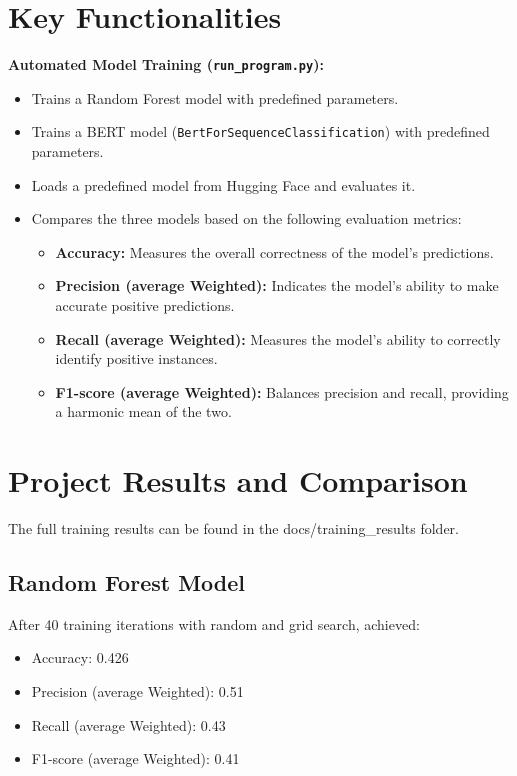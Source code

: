 \documentclass{article}
\begin{document}
\section*{Key Functionalities}
\textbf{Automated Model Training (\texttt{run\_program.py}):}
\begin{itemize}[label=--]
  \item Trains a Random Forest model with predefined parameters.
  \item Trains a BERT model (\texttt{BertForSequenceClassification}) with predefined parameters.
  \item Loads a predefined model from Hugging Face and evaluates it.
  \item Compares the three models based on the following evaluation metrics:
    \begin{itemize}
      \item \textbf{Accuracy:} Measures the overall correctness of the model's predictions.
      \item \textbf{Precision (average Weighted):} Indicates the model's ability to make accurate positive predictions.
      \item \textbf{Recall (average Weighted):} Measures the model's ability to correctly identify positive instances.
      \item \textbf{F1-score (average Weighted):} Balances precision and recall, providing a harmonic mean of the two.
    \end{itemize}
\end{itemize}

\section*{Project Results and Comparison}
The full training results can be found in the docs/training\_results folder.
\subsection*{Random Forest Model}
After 40 training iterations with random and grid search, achieved:
\begin{itemize}
  \item Accuracy: 0.426
  \item Precision (average Weighted): 0.51
  \item Recall (average Weighted): 0.43
  \item F1-score (average Weighted): 0.41
\end{itemize}
\end{document}
